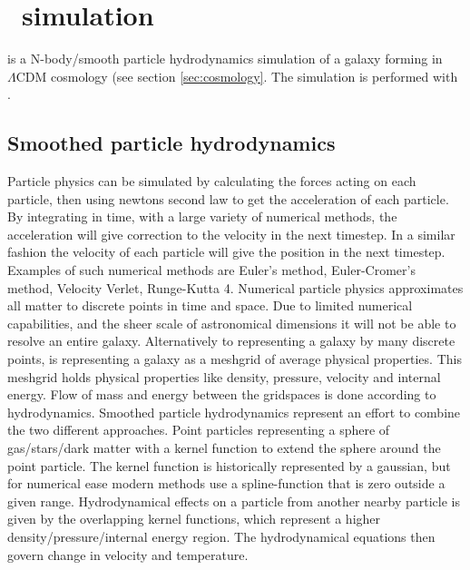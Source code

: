 \section{\eris\ simulation} \label{sec:eris}

\eris{} is a N-body/smooth particle hydrodynamics simulation of a galaxy forming in $\Lambda\mathrm{CDM}$ cosmology (see section \ref{sec:cosmology}. The simulation is performed with \gasoline{}.

\begin{figure}[h]
  \setlength{}
  
\end{figure}

\subsection{Smoothed particle hydrodynamics}
Particle physics can be simulated by calculating the forces acting on each particle, then using newtons second law to get the acceleration of each particle.
By integrating in time, with a large variety of numerical methods, the acceleration will give correction to the velocity in the next timestep.
In a similar fashion the velocity of each particle will give the position in the next timestep.
Examples of such numerical methods are Euler's method, Euler-Cromer's method, Velocity Verlet, Runge-Kutta 4.
Numerical particle physics approximates all matter to discrete points in time and space. Due to limited numerical capabilities, and the sheer scale of astronomical dimensions it will not be able to resolve an entire galaxy.
Alternatively to representing a galaxy by many discrete points, is representing a galaxy as a meshgrid of average physical properties.
This meshgrid holds physical properties like density, pressure, velocity and internal energy. Flow of mass and energy between the gridspaces is done according to hydrodynamics.
Smoothed particle hydrodynamics  represent an effort to combine the two different approaches. Point particles representing a sphere of gas/stars/dark matter with a kernel function to extend the sphere around the point particle.
The kernel function is historically represented by a gaussian, but for numerical ease modern methods use a spline-function that is zero outside a given range.
Hydrodynamical effects on a particle from another nearby particle is given by the overlapping kernel functions, which represent a higher density/pressure/internal energy region. The hydrodynamical equations then govern change in velocity and temperature.


